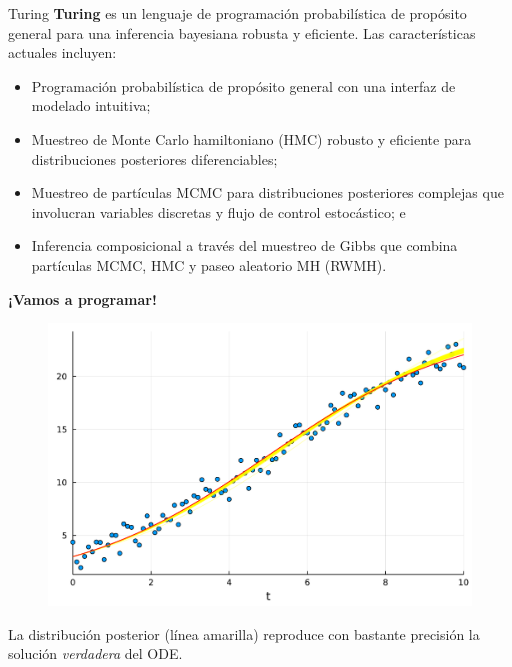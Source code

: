 \documentclass[11pt]{beamer}
\begin{document}
\begin{frame}{Turing}
\textbf{Turing} es un lenguaje de programación probabilística de propósito general para una inferencia bayesiana robusta y eficiente. Las características actuales incluyen:

	\begin{itemize}
		\item Programación probabilística de propósito general con una interfaz de modelado intuitiva;
		\item Muestreo de Monte Carlo hamiltoniano (HMC) robusto y eficiente para distribuciones posteriores diferenciables;
		\item 
Muestreo de partículas MCMC para distribuciones posteriores complejas que involucran variables discretas y flujo de control estocástico; e
		\item 
Inferencia composicional a través del muestreo de Gibbs que combina partículas MCMC, HMC y paseo aleatorio MH (RWMH).
	\end{itemize}
\end{frame}



\begin{frame}
	\begin{center}
		{\huge \textbf{¡Vamos a programar!}}
	\end{center}
\end{frame}


\begin{frame}
	\begin{figure}
		\includegraphics[scale=0.5]{images/final_plot.pdf}
	\end{figure}
	La distribución posterior (línea amarilla) reproduce con bastante precisión la solución \textit{verdadera} del ODE.
\end{frame}
\end{document}
